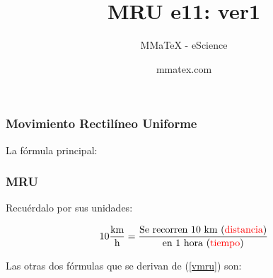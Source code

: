 \documentclass{beamer}
\title{MRU e11: ver1}
\subtitle{MMaTeX - eScience}
\author{mmatex.com}
\newcommand{\red}[1]{\textcolor{red}{#1}}
\begin{document}
\maketitle







\begin{frame}
\frametitle{Movimiento Rectil\'ineo Uniforme}

% 


La f\'ormula principal:

{\huge \vmru}

\vNUa
\end{frame}

\begin{frame}
\frametitle{MRU}
Recu\'erdalo por sus unidades:

\begin{equation*}
10\frac{\text{km}}{\text{h}} =
\frac{\text{Se recorren 10 km (\red{distancia})}}
{\text{en 1 hora (\red{tiempo})}}
\end{equation*}

Las otras dos f\'ormulas que se derivan de (\ref{vmru}) son:

{\large \xmru \\ \tmru}
\end{frame}
\end{document}
